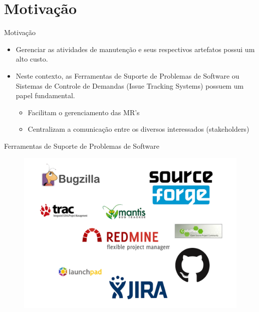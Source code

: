 \documentclass[t,14pt,mathserif]{beamer}
\begin{document}
\section{Motivação}

\begin{frame}{Motivação}
	
	\begin{itemize}
		\item Gerenciar as atividades de manutenção e seus respectivos artefatos possui um alto custo.
		\item Neste contexto, as Ferramentas de Suporte de Problemas de Software ou Sistemas de Controle de Demandas (Issue Tracking Systems) possuem um papel fundamental.
			\begin{itemize}
				\item Facilitam o gerenciamento das MR's
				\item Centralizam a comunicação entre os diversos interessados (stakeholders)
			\end{itemize}
	\end{itemize}
	
	
	
\end{frame}

\begin{frame}{Ferramentas de Suporte de Problemas de Software}
	
		\begin{figure}[hbtp]
			\centering
			\includegraphics[scale=.3]{../img/issue-tracking-sytem.png}
		\end{figure}
	
	
	
\end{frame}
\end{document}
